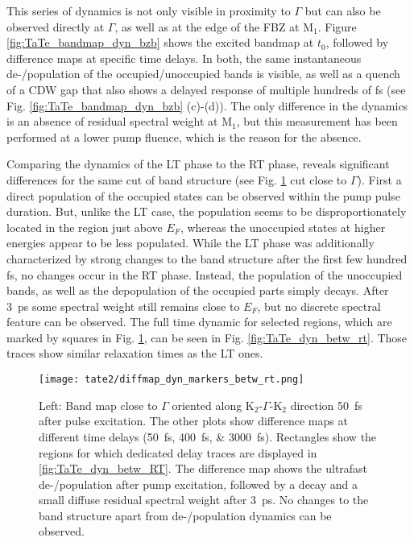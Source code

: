 This series of dynamics is not only visible in proximity to $\Gamma$ but can also be observed directly at $\Gamma$, as well as at the edge of the FBZ at M$_1$.
Figure \ref{fig:TaTe_bandmap_dyn_bzb} shows the excited bandmap at $t_0$, followed by difference maps at specific time delays.
In both, the same instantaneous de-/population of the occupied/unoccupied bands is visible, as well as a quench of a CDW gap that also shows a delayed response of multiple hundreds of \unit{\femto\second} (see Fig. \ref{fig:TaTe_bandmap_dyn_bzb} (c)-(d)).
The only difference in the dynamics is an absence of residual spectral weight at M$_1$, but this measurement has been performed at a lower pump fluence, which is the reason for the absence.

Comparing the dynamics of the LT phase to the RT phase, reveals significant differences for the same cut of band structure (see Fig. \ref{fig:TaTe_bandmap_dyn_betw_rt} cut close to $\Gamma$).
First a direct population of the occupied states can be observed within the pump pulse duration.
But, unlike the LT case, the population seems to be disproportionately located in the region just above $E_F$, whereas the unoccupied states at higher energies appear to be less populated.
While the LT phase was additionally characterized by strong changes to the band structure after the first few hundred \unit{\femto\second}, no changes occur in the RT phase.
Instead, the population of the unoccupied bands, as well as the depopulation of the occupied parts simply decays.
After \qty{3}{\pico\second} some spectral weight still remains close to $E_F$, but no discrete spectral feature can be observed.
The full time dynamic for selected regions, which are marked by squares in Fig. \ref{fig:TaTe_bandmap_dyn_betw_rt}, can be seen in Fig. \ref{fig:TaTe_dyn_betw_rt}.
Those traces show similar relaxation times as the LT ones.

\begin{figure}[t!]
	\centering
	\texttt{[image: tate2/diffmap\_dyn\_markers\_betw\_rt.png]}
	\caption{Left: Band map close to $\Gamma$ oriented along K$_2$-$\Gamma$-K$_2$ direction \qty{50}{\femto\second} after pulse excitation. The other plots show difference maps at different time delays (\qtylist{50;400;3000}{\femto\second}). Rectangles show the regions for which dedicated delay traces are displayed in \ref{fig:TaTe_dyn_betw_RT}. The difference map shows the ultrafast de-/population after pump excitation, followed by a decay and a small diffuse residual spectral weight after \qty{3}{\pico\second}. No changes to the band structure apart from de-/population dynamics can be observed.}
	\label{fig:TaTe_bandmap_dyn_betw_rt}
\end{figure}

